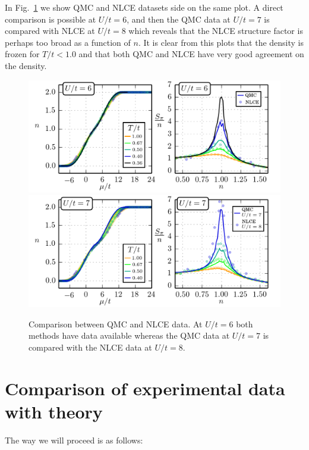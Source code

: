 \documentclass[11pt,letter]{article}
\begin{document}
In Fig.~\ref{fig:QMCvsNLCE} we show QMC and NLCE datasets side on the same
plot.  A direct comparison is possible at $U/t=6$, and then the QMC data at
$U/t=7$ is compared with NLCE at $U/t=8$ which reveals that the NLCE structure
factor is perhaps too broad as a function of $n$.   It is clear from this plots
that the density is frozen for $T/t < 1.0$ and that both QMC and NLCE have very
good agreement on the density. 
\begin{figure}
    \centering
\includegraphics[width=\textwidth]{../dataplots/QMC_Final/QMC_NLCE_Compare_U06.png}
\includegraphics[width=\textwidth]{../dataplots/QMC_Final/QMC_NLCE_Compare_U07.png}
\caption{Comparison between QMC and NLCE data.  At $U/t=6$ both methods have
data available whereas the QMC data at $U/t=7$ is compared with the NLCE data
at $U/t=8$.}
\label{fig:QMCvsNLCE}
\end{figure}


\section{ Comparison of experimental data with theory } 

The way we will proceed is as follows:
\end{document}
